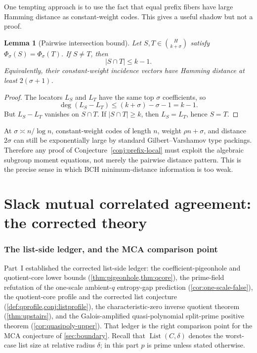 \documentclass[11pt]{article}
\newtheorem{lemma}[lemma]{Lemma}
\theoremstyle{definition}
\newcommand{\Lst}{\operatorname{List}}
\begin{document}
One tempting approach is to use the fact that equal prefix fibers have large Hamming distance as constant-weight codes.  This gives a useful shadow but not a proof.

\begin{lemma}[Pairwise intersection bound]\label{lem:pairwise}
Let $S,T\in\binom H{k+\sigma}$ satisfy $\Phi_\sigma(S)=\Phi_\sigma(T)$.  If $S\ne T$, then
\[
        |S\cap T|\le k-1.
\]
Equivalently, their constant-weight incidence vectors have Hamming distance at least $2(\sigma+1)$.
\end{lemma}

\begin{proof}
The locators $L_S$ and $L_T$ have the same top $\sigma$ coefficients, so
\[
        \deg(L_S-L_T)\le (k+\sigma)-\sigma-1=k-1.
\]
But $L_S-L_T$ vanishes on $S\cap T$.  If $|S\cap T|\ge k$, then $L_S=L_T$, hence $S=T$.
\end{proof}

At $\sigma\asymp n/\log n$, constant-weight codes of length $n$, weight $\rho n+\sigma$, and distance $2\sigma$ can still be exponentially large by standard Gilbert--Varshamov type packings.  Therefore any proof of Conjecture~\ref{conj:prefix-local} must exploit the algebraic subgroup moment equations, not merely the pairwise distance pattern.  This is the precise sense in which BCH minimum-distance information is too weak.


\part{Slack mutual correlated agreement: the corrected theory}

\section{The list-side ledger, and the MCA comparison point}\label{sec:interface}

Part~I established the corrected list-side ledger: the coefficient-pigeonhole and quotient-core lower bounds (\cref{thm:pigeonhole,thm:qcore}), the prime-field refutation of the one-scale ambient-$q$ entropy-gap prediction (\cref{cor:one-scale-false}), the quotient-core profile and the corrected list conjecture (\cref{def:qprofile,conj:listprofile}), the characteristic-zero inverse quotient theorem (\cref{thm:upstairs}), and the Galois-amplified quasi-polynomial split-prime positive theorem (\cref{cor:quasipoly-upper}).  That ledger is the right comparison point for the MCA conjecture of \cref{sec:boundary}.  Recall that $\Lst(C,\delta)$ denotes the worst-case list size at relative radius $\delta$; in this part $p$ is prime unless stated otherwise.
\end{document}
